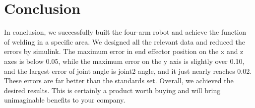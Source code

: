 \section{Conclusion}

In conclusion, we successfully built the four-arm robot and achieve the function of welding in a specific area. We designed all the relevant data and reduced the errors by simulink. The maximum error in end effector position on the x and z axes is below 0.05, while the maximum error on the y axis is slightly over 0.10, and the largest error of joint angle is joint2 angle, and it just nearly reaches 0.02. These errors are far better than the standards set. Overall, we achieved the desired results. This is certainly a product worth buying and will bring unimaginable benefits to your company.